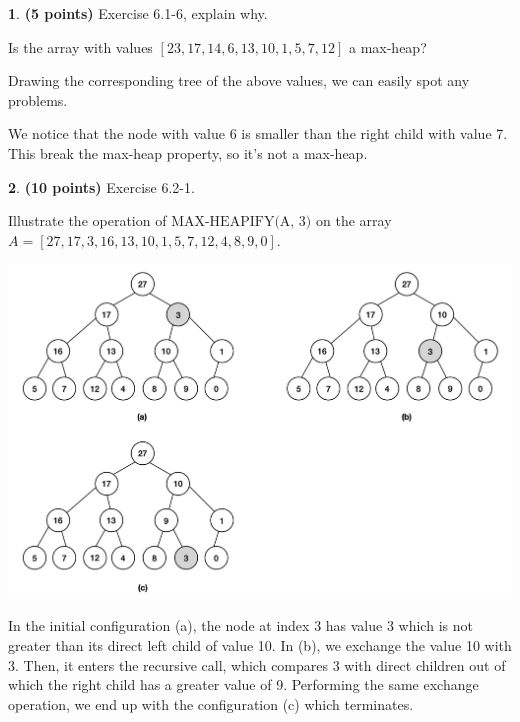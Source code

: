 \documentclass[11pt]{article}
\theoremstyle{definition}
\theoremstyle{theorem}
\newtheorem{prob}{}
\newcommand{\solution}{\medskip\noindent{\color{DarkBlue}\textbf{Solution:}}}
\begin{document}
\newpage
\begin{prob} \textbf{(5 points)} Exercise 6.1-6, explain why.

Is the array with values $[23, 17, 14, 6, 13, 10, 1, 5, 7, 12]$ a max-heap?

\solution

Drawing the corresponding tree of the above values, we can easily spot any problems.


We notice that the node with value 6 is smaller than the right child with value 7. This break the max-heap property, so it's not a max-heap.
\end{prob}

\newpage
\begin{prob} \textbf{(10 points)} Exercise 6.2-1.

Illustrate the operation of $\text{MAX-HEAPIFY(A, 3)}$ on the array $A = [27, 17, 3, 16, 13, 10, 1, 5, 7, 12, 4, 8, 9, 0]$.

\solution

\includegraphics[scale=0.7]{hw2q3.png}

In the initial configuration (a), the node at index 3 has value 3 which is not greater than its direct left child of value 10. In (b), we exchange the value 10 with 3. Then, it enters the recursive call, which compares 3 with direct children out of which the right child has a greater value of 9. Performing the same exchange operation, we end up with the configuration (c) which terminates.
\end{prob}
\end{document}
